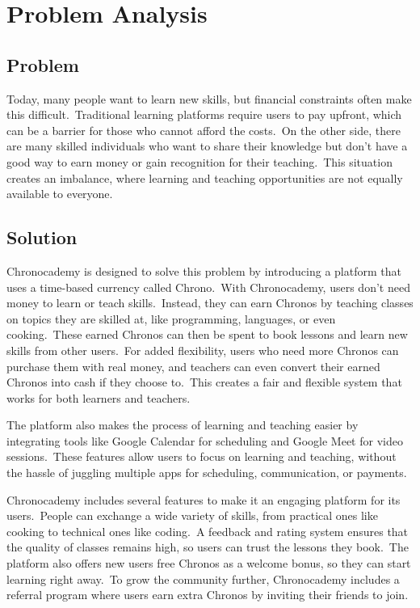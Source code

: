 \section{Problem Analysis}\label{sec:problem-analisys}

\subsection{Problem}\label{subsec:problem}
Today, many people want to learn new skills, but financial constraints often make this difficult.\ Traditional learning platforms require users to pay upfront, which can be a barrier for those who cannot afford the costs.\ On the other side, there are many skilled individuals who want to share their knowledge but don’t have a good way to earn money or gain recognition for their teaching.\ This situation creates an imbalance, where learning and teaching opportunities are not equally available to everyone.

\subsection{Solution}\label{subsec:solution}
Chronocademy is designed to solve this problem by introducing a platform that
uses a time-based currency called Chrono.\ With Chronocademy, users don’t need
money to learn or teach skills.\ Instead, they can earn Chronos by teaching
classes on topics they are skilled at, like programming, languages, or even
cooking.\ These earned Chronos can then be spent to book lessons and learn new
skills from other users.\ For added flexibility, users who need more Chronos
can purchase them with real money, and teachers can even convert their earned
Chronos into cash if they choose to.\ This creates a fair and flexible system
that works for both learners and teachers.

The platform also makes the process of learning and teaching easier by integrating tools like Google Calendar for scheduling and Google Meet for video sessions.\ These features allow users to focus on learning and teaching, without the hassle of juggling multiple apps for scheduling, communication, or payments.

Chronocademy includes several features to make it an engaging platform for its
users.\ People can exchange a wide variety of skills, from practical ones like
cooking to technical ones like coding.\ A feedback and rating system ensures
that the quality of classes remains high, so users can trust the lessons they
book.\ The platform also offers new users free Chronos as a welcome bonus, so
they can start learning right away.\ To grow the community further,
Chronocademy includes a referral program where users earn extra Chronos by
inviting their friends to join.

